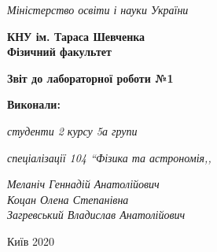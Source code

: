 \thispagestyle{empty} %
\begin{center}
	\textit{Міністерство освіти і науки України \\}
	\vspace{0.5ex}
	
	\textbf{КНУ ім. Тараса Шевченка \\ 
		Фізичний факультет}
\end{center}

\begin{center}
	\vspace{13ex}
	\textbf{Звіт до лабораторної роботи №1}

	
    \vspace{35ex}  
    
    
	\begin{flushright}
	\textbf{Виконали:} 
	
	\noindent
	\textit{студенти 2 курсу 5а групи} 
	
	
	\textit{спеціалізації 104 ``Фізика та астрономія,,}
	
	\textit{Меланіч Геннадій Анатолійович}
	\\
	\textit{Коцан Олена Степанівна} 
	\\
	\textit{Загревський Владислав Анатолійович}
	
\end{flushright}
	
	\vfill
	Київ 2020
\end{center}